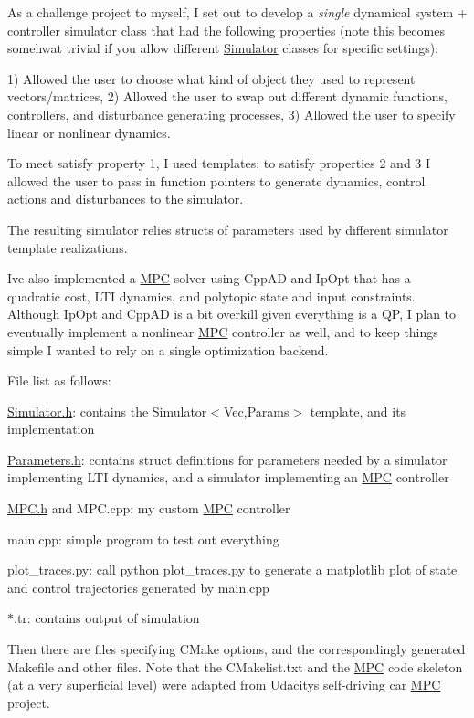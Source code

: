 As a challenge project to myself, I set out to develop a {\itshape single} dynamical system + controller simulator class that had the following properties (note this becomes somehwat trivial if you allow different \mbox{\hyperlink{classSimulator}{Simulator}} classes for specific settings)\+:

1) Allowed the user to choose what kind of object they used to represent vectors/matrices, 2) Allowed the user to swap out different dynamic functions, controllers, and disturbance generating processes, 3) Allowed the user to specify linear or nonlinear dynamics.

To meet satisfy property 1, I used templates; to satisfy properties 2 and 3 I allowed the user to pass in function pointers to generate dynamics, control actions and disturbances to the simulator.

The resulting simulator relies structs of parameters used by different simulator template realizations.

I\textquotesingle{}ve also implemented a \mbox{\hyperlink{classMPC}{M\+PC}} solver using Cpp\+AD and Ip\+Opt that has a quadratic cost, L\+TI dynamics, and polytopic state and input constraints. Although Ip\+Opt and Cpp\+AD is a bit overkill given everything is a QP, I plan to eventually implement a nonlinear \mbox{\hyperlink{classMPC}{M\+PC}} controller as well, and to keep things simple I wanted to rely on a single optimization backend.

File list as follows\+:


\begin{DoxyItemize}
\item \mbox{\hyperlink{Simulator_8h_source}{Simulator.\+h}}\+: contains the Simulator$<$\+Vec,\+Params$>$ template, and its implementation
\item \mbox{\hyperlink{Parameters_8h_source}{Parameters.\+h}}\+: contains struct definitions for parameters needed by a simulator implementing L\+TI dynamics, and a simulator implementing an \mbox{\hyperlink{classMPC}{M\+PC}} controller
\item \mbox{\hyperlink{MPC_8h_source}{M\+P\+C.\+h}} and M\+P\+C.\+cpp\+: my custom \mbox{\hyperlink{classMPC}{M\+PC}} controller
\item main.\+cpp\+: simple program to test out everything
\item plot\+\_\+traces.\+py\+: call python plot\+\_\+traces.\+py to generate a matplotlib plot of state and control trajectories generated by main.\+cpp
\item $\ast$.tr\+: contains output of simulation
\end{DoxyItemize}

Then there are files specifying C\+Make options, and the correspondingly generated Makefile and other files. Note that the C\+Makelist.\+txt and the \mbox{\hyperlink{classMPC}{M\+PC}} code skeleton (at a very superficial level) were adapted from Udacity\textquotesingle{}s self-\/driving car \mbox{\hyperlink{classMPC}{M\+PC}} project. 